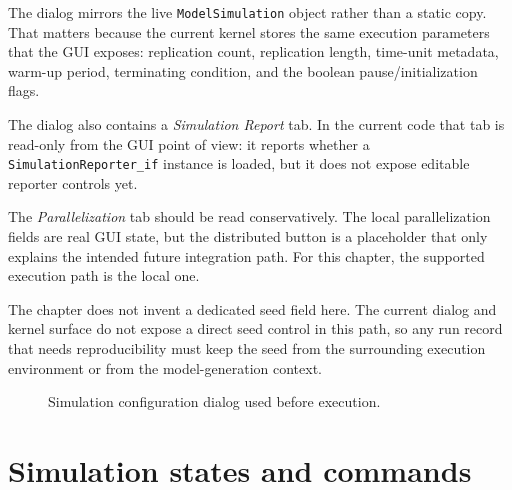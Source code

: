 The dialog mirrors the live \texttt{ModelSimulation} object rather than a
static copy. That matters because the current kernel stores the same execution
parameters that the GUI exposes: replication count, replication length,
time-unit metadata, warm-up period, terminating condition, and the boolean
pause/initialization flags.

The dialog also contains a \textit{Simulation Report} tab. In the current code
that tab is read-only from the GUI point of view: it reports whether a
\texttt{SimulationReporter\_if} instance is loaded, but it does not expose
editable reporter controls yet.

The \textit{Parallelization} tab should be read conservatively. The local
parallelization fields are real GUI state, but the distributed button is a
placeholder that only explains the intended future integration path. For this
chapter, the supported execution path is the local one.

The chapter does not invent a dedicated seed field here. The current dialog and
kernel surface do not expose a direct seed control in this path, so any run
record that needs reproducibility must keep the seed from the surrounding
execution environment or from the model-generation context.

\begin{figure}[htbp]
\centering
\caption{Simulation configuration dialog used before execution.}
\label{fig:running-simulations-config}
\end{figure}

\section{Simulation states and commands}
\label{sec:running-simulations-states}

